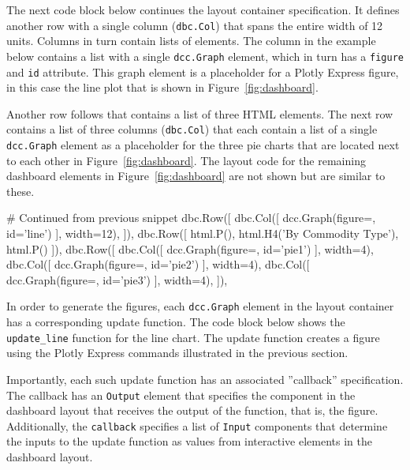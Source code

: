 The next code block below continues the layout container specification. It defines another row with a single column (\texttt{dbc.Col}) that spans the entire width of 12 units. Columns in turn contain lists of elements. The column in the example below contains a list with a single \texttt{dcc.Graph} element, which in turn has a \texttt{figure} and \texttt{id} attribute. This graph element is a placeholder for a Plotly Express figure, in this case the line plot that is shown in Figure~\ref{fig:dashboard}.

Another row follows that contains a list of three HTML elements. The next row contains a list of three columns (\texttt{dbc.Col}) that each contain a list of a single \texttt{dcc.Graph} element as a placeholder for the three pie charts that are located next to each other in Figure~\ref{fig:dashboard}. The layout code for the remaining dashboard elements in Figure~\ref{fig:dashboard} are not shown but are similar to these.

\begin{samepage}
\begin{pythoncode}
# Continued from previous snippet
   dbc.Row([
        dbc.Col([
            dcc.Graph(figure={}, id='line')
        ], width=12),
    ]),
    dbc.Row([
        html.P(),
        html.H4('By Commodity Type'),
        html.P()
    ]),
    dbc.Row([
        dbc.Col([
            dcc.Graph(figure={}, id='pie1')
        ], width=4),
        dbc.Col([
            dcc.Graph(figure={}, id='pie2')
        ], width=4),
        dbc.Col([
            dcc.Graph(figure={}, id='pie3')
        ], width=4),
    ]),
\end{pythoncode}
\end{samepage}

In order to generate the figures, each \texttt{dcc.Graph} element in the layout container has a corresponding update function. The code block below shows the \texttt{update\_line} function for the line chart. The update function creates a figure using the Plotly Express commands illustrated in the previous section.

Importantly, each such update function has an associated ''callback'' specification. The callback has an \texttt{Output} element that specifies the component in the dashboard layout that receives the output of the function, that is, the figure. Additionally, the \texttt{callback} specifies a list of \texttt{Input} components that determine the inputs to the update function as values from interactive elements in the dashboard layout. 

